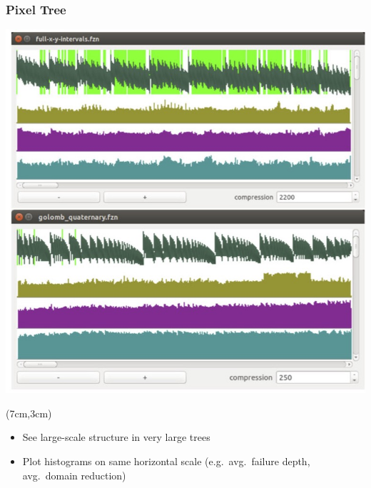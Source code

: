 \documentclass[dvipsnames,aspectratio=169]{beamer}
\begin{document}
\begin{frame}
  \frametitle{Pixel Tree \cite{DBLP:journals/constraints/ShishmarevMTB16}}
  
  \includegraphics[height=0.7\textheight]{images/pixeltree.jpg}
  \begin{textblock*}{8cm}(7cm,3cm)
  \begin{itemize}
      \item See large-scale structure in very large trees
      \item Plot histograms on same horizontal scale (e.g.\ avg.\ failure depth, avg.\ domain reduction)
  \end{itemize}
  \end{textblock*}
  
\end{frame}
\end{document}
